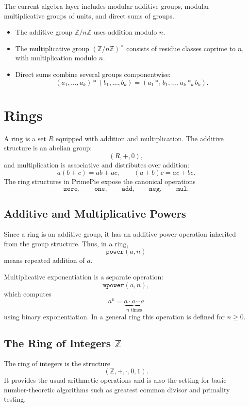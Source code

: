The current algebra layer includes modular additive groups, modular
multiplicative groups of units, and direct sums of groups.

\begin{itemize}
  \item The additive group $\mathbb{Z}/n\mathbb{Z}$ uses addition modulo $n$.
  \item The multiplicative group $(\mathbb{Z}/n\mathbb{Z})^\times$ consists of
        residue classes coprime to $n$, with multiplication modulo $n$.
  \item Direct sums combine several groups componentwise:
        \[
          (a_1,\ldots,a_k) \ast (b_1,\ldots,b_k)
          =
          (a_1 \ast_1 b_1,\ldots,a_k \ast_k b_k).
        \]
\end{itemize}

\section{Rings}

A ring is a set $R$ equipped with addition and multiplication. The additive
structure is an abelian group:
\[
  (R,+,0),
\]
and multiplication is associative and distributes over addition:
\[
a(b+c)=ab+ac,
\qquad
(a+b)c=ac+bc.
\]
The ring structures in PrimePie expose the canonical operations
\[
\texttt{zero}, \qquad
\texttt{one}, \qquad
\texttt{add}, \qquad
\texttt{neg}, \qquad
\texttt{mul}.
\]

\subsection*{Additive and Multiplicative Powers}

Since a ring is an additive group, it has an additive power operation inherited
from the group structure. Thus, in a ring,
\[
  \texttt{power}(a,n)
\]
means repeated addition of $a$.

Multiplicative exponentiation is a separate operation:
\[
  \texttt{mpower}(a,n),
\]
which computes
\[
a^n =
\underbrace{a \cdot a \cdots a}_{n \text{ times}}
\]
using binary exponentiation. In a general ring this operation is defined for
$n \ge 0$.

\subsection*{The Ring of Integers \texorpdfstring{$\mathbb{Z}$}{Z}}

The ring of integers is the structure
\[
  (\mathbb{Z}, +, \cdot, 0, 1).
\]
It provides the usual arithmetic operations and is also the setting for basic
number-theoretic algorithms such as greatest common divisor and primality
testing.

